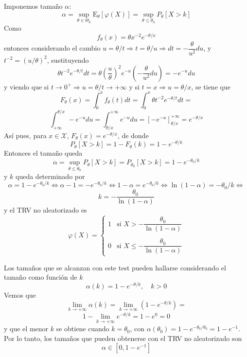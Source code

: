 \documentclass[12pt]{article}
\newcommand{\E}{\mathrm{E}}
\newcommand{\X}{\mathcal{X}}
\begin{document}
\begin{ejercicio}[2,4 puntos]
\begin{enumerate}
            Imponemos tamaño $\alpha$:
            $$\alpha = \sup_{\theta \in \Theta_0} \E_\theta[\varphi(X)] = \sup_{\theta \leqslant \theta_0} P_\theta
            [X > k]$$
            Como $$f_\theta(x) = \theta x^{-2} e^{-\theta/x}$$
            entonces considerando el cambio $u = \theta/t \Longrightarrow t = \theta/u \Longrightarrow 
            dt = - \dfrac{\theta}{u^2} du$, y $t^{-2} = (u/\theta)^2$, sustituyendo $$\theta t^{-2} e^{-\theta/t} dt = \theta \left( \dfrac{u}{\theta} \right)^2 e^{-u}
            \left( - \dfrac{\theta}{u^2} du \right) = -e^{-u} du$$
            y viendo que si $t \to 0^{+} \Longrightarrow u = \theta / t \to +\infty$
            y si $t = x \Longrightarrow u = \theta / x$, se tiene que 
            $$F_\theta(x) = \int_{0}^{x} f_\theta(t) dt = \int_{0}^{x} \theta t^{-2} e^{-\theta/t} dt = $$
            $$\int_{+\infty}^{\theta/x} -e^{-u} du = \int_{\theta/x}^{+\infty} e^{-u} du = [-e^{-u}]_{\theta/x}^{+\infty}
            = e^{-\theta/x}$$
            Así pues, para $x \in \X$, $F_\theta(x) = e^{-\theta/x}$, de donde
            $$P_\theta[X > k] = 1 - F_\theta(k) = 1 - e^{-\theta/k}$$
            Entonces el tamaño queda
            $$\alpha = \sup_{\theta \leqslant \theta_0} P_\theta [X > k] = P_{\theta_0}[X>k] = 1 - e^{-\theta_0/k}$$
            y $k$ queda determinado por
            $$\alpha = 1 - e^{-\theta_0/k} \iff \alpha - 1 = - e^{-\theta_0/k} \iff
            1 - \alpha = e^{-\theta_0/k} \iff \ln(1-\alpha) = -\theta_0 / k \iff$$$$k = - \dfrac{\theta_0}{\ln(1-\alpha)}$$
            y el TRV no aleatorizado es
            $$
            \varphi(X) = \begin{cases}
                1 &\text{si } X > - \dfrac{\theta_0}{\ln(1-\alpha)} \\\\
                0 &\text{si } X \leqslant - \dfrac{\theta_0}{\ln(1-\alpha)}
            \end{cases} 
            $$

            Los tamaños que se alcanzan con este test pueden hallarse considerando el tamaño como función de $k$
            $$\alpha(k) = 1 - e^{-\theta/k}, \quad k > 0$$
            Vemos que $$\lim\limits_{k \to +\infty} \alpha(k) = \lim\limits_{k \to +\infty} (1 - e^{-\theta/k}) = $$
            $$1 - \lim\limits_{k \to +\infty} e^{-\theta/k} = 1 - e^{0} = 0$$
            y que el menor $k$ se obtiene cuando $k = \theta_0$, con
            $\alpha(\theta_0) = 1 - e^{-\theta_0/\theta_0} = 1 - e^{-1}$.
            Por lo tanto, los tamaños que pueden obtenerse con el TRV no aleatorizado son
            $$\alpha \in [0, 1 - e^{-1}]$$ 


\end{enumerate}
\end{ejercicio}
\end{document}
